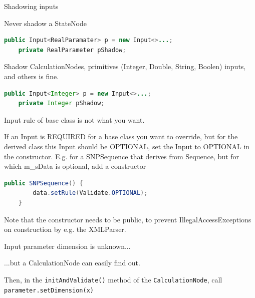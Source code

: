 \documentclass{beamer}
\theoremstyle{definition}
\begin{document}
\begin{frame}[containsverbatim]{Shadowing inputs}

Never shadow a StateNode

\begin{lstlisting}[language=java]
    public Input<RealParamater> p = new Input<>...;
    private RealParameter pShadow;
\end{lstlisting}


Shadow CalculationNodes, 
primitives (Integer, Double, String, Boolen) inputs, 
and others is fine.


\begin{lstlisting}[language=java]
    public Input<Integer> p = new Input<>...;
    private Integer pShadow;
\end{lstlisting}


\end{frame}
\fi

\begin{frame}[containsverbatim]{Input rule of base class is not what you want.}

If an Input is REQUIRED for a base class you want to override, but for the derived
class this Input should be OPTIONAL, set the Input to OPTIONAL in the constructor.
E.g. for a SNPSequence that derives from Sequence, but for which m\_sData is optional,
add a constructor

{\color{blue}\begin{lstlisting}[language=java]
	public SNPSequence() {
		data.setRule(Validate.OPTIONAL);
	}
\end{lstlisting}}
Note that the constructor needs to be public, to prevent IllegalAccessExceptions
on construction by e.g. the XMLParser.

\end{frame}

\begin{frame}[containsverbatim]{Input parameter dimension is unknown...}

...but a CalculationNode can easily find out.\vskip 0.5cm

Then, in the {\tt initAndValidate()} method of the {\tt CalculationNode},
call {\tt parameter.setDimension(x)}


\end{frame}
\end{document}
